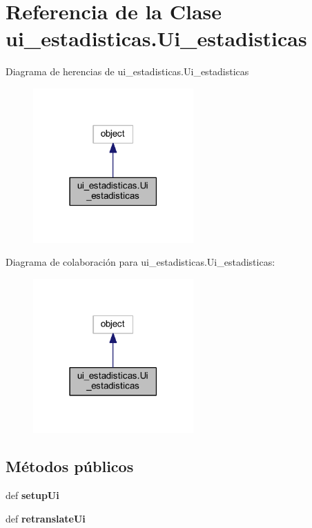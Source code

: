 \section{Referencia de la Clase ui\-\_\-estadisticas.\-Ui\-\_\-estadisticas}
\label{classui__estadisticas_1_1_ui__estadisticas}


Diagrama de herencias de ui\-\_\-estadisticas.\-Ui\-\_\-estadisticas
\nopagebreak
\begin{figure}[H]
\begin{center}
\leavevmode
\includegraphics[width=174pt]{classui__estadisticas_1_1_ui__estadisticas__inherit__graph}
\end{center}
\end{figure}


Diagrama de colaboración para ui\-\_\-estadisticas.\-Ui\-\_\-estadisticas\-:
\nopagebreak
\begin{figure}[H]
\begin{center}
\leavevmode
\includegraphics[width=174pt]{classui__estadisticas_1_1_ui__estadisticas__coll__graph}
\end{center}
\end{figure}
\subsection*{Métodos públicos}
\begin{DoxyCompactItemize}
\item 
def {\bfseries setup\-Ui}\label{classui__estadisticas_1_1_ui__estadisticas_ae38f5c752c668fb8bafde4bf8e0e25c0}

\item 
def {\bfseries retranslate\-Ui}\label{classui__estadisticas_1_1_ui__estadisticas_a488e6f5e5d2a2a39d4261bb15e2318a1}

\end{DoxyCompactItemize}
